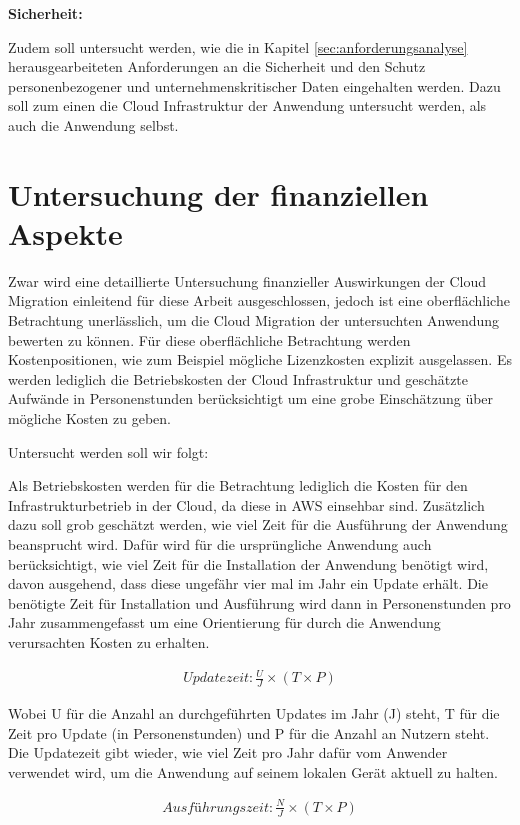 \textbf{Sicherheit:}

Zudem soll untersucht werden, wie die in Kapitel \ref{sec:anforderungsanalyse} herausgearbeiteten Anforderungen an die Sicherheit und den Schutz personenbezogener und unternehmenskritischer Daten eingehalten werden. Dazu soll zum einen die Cloud Infrastruktur der Anwendung untersucht werden, als auch die Anwendung selbst.

\section{Untersuchung der finanziellen Aspekte}
Zwar wird eine detaillierte Untersuchung finanzieller Auswirkungen der Cloud Migration einleitend für diese Arbeit ausgeschlossen, jedoch ist eine oberflächliche Betrachtung unerlässlich, um die Cloud Migration der untersuchten Anwendung bewerten zu können. Für diese oberflächliche Betrachtung werden Kostenpositionen, wie zum Beispiel mögliche Lizenzkosten explizit ausgelassen. Es werden lediglich die Betriebskosten der Cloud Infrastruktur und geschätzte Aufwände in Personenstunden berücksichtigt um eine grobe Einschätzung über mögliche Kosten zu geben.

Untersucht werden soll wir folgt:

Als Betriebskosten werden für die Betrachtung lediglich die Kosten für den Infrastrukturbetrieb in der Cloud, da diese in \ac{AWS} einsehbar sind. Zusätzlich dazu soll grob geschätzt werden, wie viel Zeit für die Ausführung der Anwendung beansprucht wird. Dafür wird für die ursprüngliche Anwendung auch berücksichtigt, wie viel Zeit für die Installation der Anwendung benötigt wird, davon ausgehend, dass diese ungefähr vier mal im Jahr ein Update erhält. Die benötigte Zeit für Installation und Ausführung wird dann in Personenstunden pro Jahr zusammengefasst um eine Orientierung für durch die Anwendung verursachten Kosten zu erhalten.

\begin{align}
    Updatezeit: \frac{U}{J} \times \left(T \times P\right) 
\end{align}

Wobei U für die Anzahl an durchgeführten Updates im Jahr (J) steht, T für die Zeit pro Update (in Personenstunden) und P für die Anzahl an Nutzern steht. Die Updatezeit gibt wieder, wie viel Zeit pro Jahr dafür vom Anwender verwendet wird, um die Anwendung auf seinem lokalen Gerät aktuell zu halten.

\begin{align}
    Ausführungszeit: \frac{N}{J} \times \left(T \times P\right) 
\end{align}

